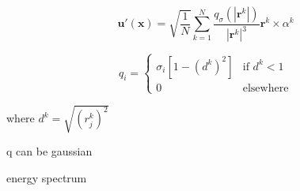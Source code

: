\documentclass{article}
\begin{document}
\begin{equation}
  \mathbf{u}'(\mathbf{x}) = \sqrt{\frac{1}{N}}\sum_{k=1}^{N}\frac{q_\sigma(|\mathbf{r}^k|)}{|\mathbf{r}^k|^3}\mathbf{r}^k\times\alpha^k
\end{equation}


\begin{equation}
q_i = 
\begin{cases} 
  \sigma_i [1-(d^k)^2] & \text{if } d^k < 1 \\
  0 & \text{elsewhere} 
\end{cases}
\end{equation}

where $d^k = \sqrt{(r^k_j)^2}$

q can be gaussian

energy spectrum
\end{document}
